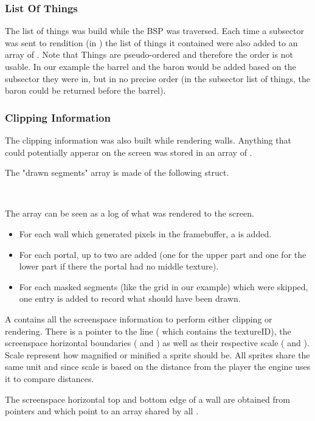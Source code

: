 \subsubsection{List Of Things}
 The list of things was build while the BSP was traversed. Each time a subsector was sent to rendition (in ) the list of things it contained were also added to an array of . Note that Things are pseudo-ordered and therefore the order is not usable. In our example the barrel and the baron would be added based on the subsector they were in, but in no precise order (in the subsector list of things, the baron could be returned before the barrel).\\
 \par
 \subsubsection{Clipping Information}
 The clipping information was also built while rendering walls. Anything that could potentially apperar on the screen was stored in an array of .\\
\par

The "drawn segments" array  is made of the following  struct.\\
\par
{}\\
\par
The array  can be seen as a log of what was rendered to the screen.\\
\begin{itemize} 
	\item For each wall which generated pixels in the framebuffer, a  is added.
	\item For each portal, up to two  are added (one for the upper part and one for the lower part if there the portal had no middle texture).
	\item For each masked segments (like the grid  in our example) which were skipped, one  entry is added to record what should have been drawn.
\end{itemize}
A  contains all the screenspace information to perform either clipping or rendering. There is a pointer to the line ( which contains the textureID), the screenspace horizontal boundaries ( and ) as well as their respective scale ( and ). Scale represent how magnified or minified a sprite should be. All sprites share the same unit and since scale is based on the distance from the player the engine uses it to compare  distances.\\
\par
The screenspace horizontal top and bottom edge of a wall are obtained from pointers  and  which point to an array shared by all .\\
\par
{} 
\pagebreak

